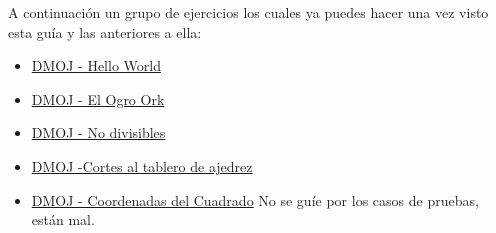 A continuación un grupo de ejercicios los cuales ya puedes hacer una vez visto esta guía y las anteriores a ella:

\begin{itemize}
	\item \href{https://dmoj.uclv.edu.cu/problem/hello}{DMOJ - Hello World}
	\item \href{https://dmoj.uclv.edu.cu/problem/ogroork}{DMOJ - El Ogro Ork}
	\item \href{https://dmoj.uclv.edu.cu/problem/divide}{DMOJ - No divisibles}
	\item \href{https://dmoj.uclv.edu.cu/problem/crne}{DMOJ -Cortes al tablero de ajedrez}
	\item \href{https://dmoj.uclv.edu.cu/problem/22psna}{DMOJ - Coordenadas del Cuadrado} No se guíe por los casos de pruebas, están mal. 
\end{itemize}